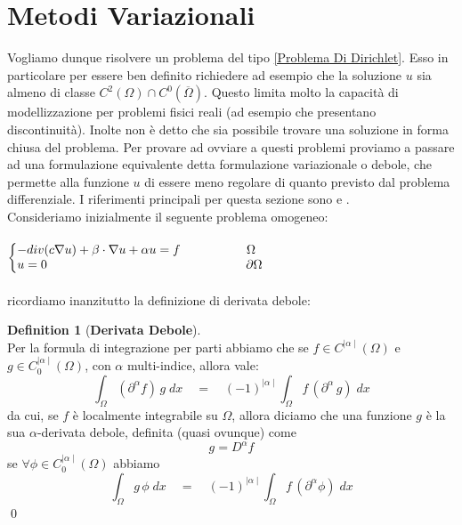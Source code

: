 \documentclass[12pt,a4paper]{report}
\makeatletter
\theoremstyle{theorem}
\theoremstyle{theorem}
\theoremstyle{definition}
\newtheorem{definition}{Definition}[section]
\newenvironment{system}
{\left\lbrace\begin{array}{@{}l@{}}}
{\end{array}\right.}
\makeatother
\begin{document}
\section{Metodi Variazionali}
Vogliamo dunque risolvere un problema del tipo \ref{Problema Di Dirichlet}. Esso in particolare per essere ben definito richiedere ad esempio che la soluzione $u$ sia almeno di classe $C^2(\Omega) \cap C^0(\overline{\Omega})$. Questo limita molto la capacità di modellizzazione per problemi fisici reali (ad esempio che presentano discontinuità). Inolte non è detto che sia possibile trovare una soluzione in forma chiusa del problema. Per provare ad ovviare a questi problemi proviamo a passare ad una formulazione equivalente detta formulazione variazionale o debole, che permette alla funzione $u$ di essere meno regolare di quanto previsto dal problema differenziale. I riferimenti principali per questa sezione sono \cite{Brezis} e \cite{Evans}.\\
Consideriamo inizialmente il seguente problema omogeneo:\\\\
 \label{Problema Di Dirichlet Omogeneo}
\begin{math}
\begin{system}
-div(c\nabla{u})+\beta \cdot \nabla{u} + \alpha u = f \qquad \qquad \quad \ \Omega \\
u = 0 \quad \qquad \qquad \qquad \qquad \qquad \qquad \qquad \quad \partial \Omega \\
\end{system}
\end{math}
\hfill \\\\
ricordiamo inanzitutto la definizione di derivata debole:
\begin{definition} [\textbf{Derivata Debole}]   \label{Derivata Debole}
\hfill \\
Per la formula di integrazione per parti abbiamo che se $f \in C^{\mid \alpha \mid}(\Omega)$ e $g \in C_{0}^{\mid \alpha \mid}(\Omega)$, con $\alpha$ multi-indice, allora vale:
\[ \int_{\Omega} { (\partial^{\alpha} f) \, g \; dx } \quad = \quad (-1)^{\mid \alpha \mid} \int_{\Omega} { f \, (\partial^{\alpha} \, g) \;dx } \]
da cui, se $f$ è localmente integrabile su $\Omega$, allora diciamo che una funzione $g$ è la sua $\alpha$-derivata debole, definita (quasi ovunque) come
\[ g = D^{ \alpha }f \]
se $\forall \phi \in  C_{0}^{\mid \alpha \mid}(\Omega)$ abbiamo
\[ \int_{\Omega} { g \, \phi \; dx } \quad = \quad (-1)^{\mid \alpha \mid} \int_{\Omega} { f \, (\partial^{\alpha} \phi) \; dx} \]
\qed
\end{definition}
\end{document}
